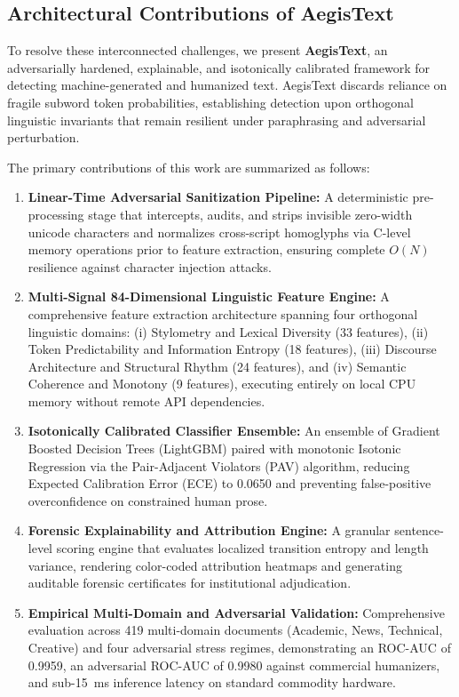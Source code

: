 \documentclass[conference]{IEEEtran}
\begin{document}
\subsection{Architectural Contributions of AegisText}
To resolve these interconnected challenges, we present \textbf{AegisText}, an adversarially hardened, explainable, and isotonically calibrated framework for detecting machine-generated and humanized text. AegisText discards reliance on fragile subword token probabilities, establishing detection upon orthogonal linguistic invariants that remain resilient under paraphrasing and adversarial perturbation. 

The primary contributions of this work are summarized as follows:
\begin{enumerate}
    \item \textbf{Linear-Time Adversarial Sanitization Pipeline:} A deterministic pre-processing stage that intercepts, audits, and strips invisible zero-width unicode characters and normalizes cross-script homoglyphs via C-level memory operations prior to feature extraction, ensuring complete $O(N)$ resilience against character injection attacks.
    \item \textbf{Multi-Signal 84-Dimensional Linguistic Feature Engine:} A comprehensive feature extraction architecture spanning four orthogonal linguistic domains: (i) Stylometry and Lexical Diversity (33 features), (ii) Token Predictability and Information Entropy (18 features), (iii) Discourse Architecture and Structural Rhythm (24 features), and (iv) Semantic Coherence and Monotony (9 features), executing entirely on local CPU memory without remote API dependencies.
    \item \textbf{Isotonically Calibrated Classifier Ensemble:} An ensemble of Gradient Boosted Decision Trees (LightGBM) paired with monotonic Isotonic Regression via the Pair-Adjacent Violators (PAV) algorithm, reducing Expected Calibration Error (ECE) to 0.0650 and preventing false-positive overconfidence on constrained human prose.
    \item \textbf{Forensic Explainability and Attribution Engine:} A granular sentence-level scoring engine that evaluates localized transition entropy and length variance, rendering color-coded attribution heatmaps and generating auditable forensic certificates for institutional adjudication.
    \item \textbf{Empirical Multi-Domain and Adversarial Validation:} Comprehensive evaluation across 419 multi-domain documents (Academic, News, Technical, Creative) and four adversarial stress regimes, demonstrating an ROC-AUC of 0.9959, an adversarial ROC-AUC of 0.9980 against commercial humanizers, and sub-15~ms inference latency on standard commodity hardware.
\end{enumerate}
\end{document}
